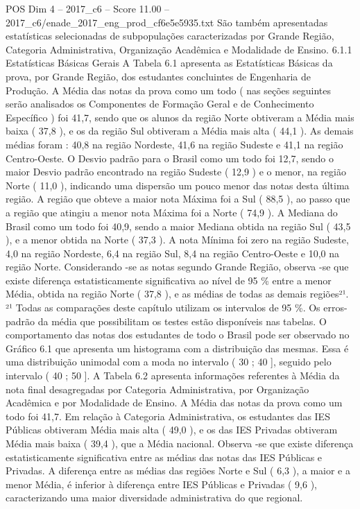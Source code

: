 \begin{textsample}{POS Dim 4 – 2017\_c6 – Score 11.00 – 2017\_c6/enade\_2017\_eng\_prod\_cf6e5e5935.txt}
São também apresentadas estatísticas selecionadas de subpopulações caracterizadas por Grande Região, Categoria Administrativa, Organização Acadêmica e Modalidade de Ensino. 6.1.1 Estatísticas Básicas Gerais A Tabela 6.1 apresenta as Estatísticas Básicas da prova, por Grande Região, dos estudantes concluintes de Engenharia de Produção.
A Média das notas da prova como um todo ( nas seções seguintes serão analisados os Componentes de Formação Geral e de Conhecimento Específico ) foi 41,7, sendo que os alunos da região Norte obtiveram a Média mais baixa ( 37,8 ), e os da região Sul obtiveram a Média mais alta ( 44,1 ).
As demais médias foram : 40,8 na região Nordeste, 41,6 na região Sudeste e 41,1 na região Centro-Oeste.
O Desvio padrão para o Brasil como um todo foi 12,7, sendo o maior Desvio padrão encontrado na região Sudeste ( 12,9 ) e o menor, na região Norte ( 11,0 ), indicando uma dispersão um pouco menor das notas desta última região.
A região que obteve a maior nota Máxima foi a Sul ( 88,5 ), ao passo que a região que atingiu a menor nota Máxima foi a Norte ( 74,9 ).
A Mediana do Brasil como um todo foi 40,9, sendo a maior Mediana obtida na região Sul ( 43,5 ), e a menor obtida na Norte ( 37,3 ).
A nota Mínima foi zero na região Sudeste, 4,0 na região Nordeste, 6,4 na região Sul, 8,4 na região Centro-Oeste e 10,0 na região Norte.
Considerando -se as notas segundo Grande Região, observa -se que existe diferença estatisticamente significativa ao nível de 95 \% entre a menor Média, obtida na região Norte ( 37,8 ), e as médias de todas as demais regiões²¹. ²¹ Todas as comparações deste capítulo utilizam os intervalos de 95 \%.
Os erros-padrão da média que possibilitam os testes estão disponíveis nas tabelas.
O comportamento das notas dos estudantes de todo o Brasil pode ser observado no Gráfico 6.1 que apresenta um histograma com a distribuição das mesmas.
Essa é uma distribuição unimodal com a moda no intervalo ( 30 ; 40 ], seguido pelo intervalo ( 40 ; 50 ].
A Tabela 6.2 apresenta informações referentes à Média da nota final desagregadas por Categoria Administrativa, por Organização Acadêmica e por Modalidade de Ensino.
A Média das notas da prova como um todo foi 41,7.
Em relação à Categoria Administrativa, os estudantes das IES Públicas obtiveram Média mais alta ( 49,0 ), e os das IES Privadas obtiveram Média mais baixa ( 39,4 ), que a Média nacional.
Observa -se que existe diferença estatisticamente significativa entre as médias das notas das IES Públicas e Privadas.
A diferença entre as médias das regiões Norte e Sul ( 6,3 ), a maior e a menor Média, é inferior à diferença entre IES Públicas e Privadas ( 9,6 ), caracterizando uma maior diversidade administrativa do que regional.

\end{textsample}
